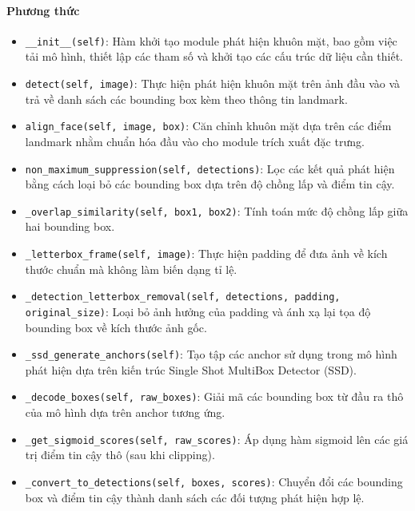 \paragraph{Phương thức}
\begin{itemize}
    \item \texttt{\_\_init\_\_(self)}: Hàm khởi tạo module phát hiện khuôn mặt, bao gồm việc tải mô hình, thiết lập các tham số và khởi tạo các cấu trúc dữ liệu cần thiết.
    
    \item \texttt{detect(self, image)}: Thực hiện phát hiện khuôn mặt trên ảnh đầu vào và trả về danh sách các bounding box kèm theo thông tin landmark.

    \item \texttt{align\_face(self, image, box)}: Căn chỉnh khuôn mặt dựa trên các điểm landmark nhằm chuẩn hóa đầu vào cho module trích xuất đặc trưng.
    
    \item \texttt{non\_maximum\_suppression(self, detections)}: Lọc các kết quả phát hiện bằng cách loại bỏ các bounding box dựa trên độ chồng lấp và điểm tin cậy.
    
    \item \texttt{\_overlap\_similarity(self, box1, box2)}: Tính toán mức độ chồng lấp giữa hai bounding box.
    
    \item \texttt{\_letterbox\_frame(self, image)}: Thực hiện padding để đưa ảnh về kích thước chuẩn mà không làm biến dạng tỉ lệ.
    
    \item \texttt{\_detection\_letterbox\_removal(self, detections, padding, original\_size)}: Loại bỏ ảnh hưởng của padding và ánh xạ lại tọa độ bounding box về kích thước ảnh gốc.
    
    \item \texttt{\_ssd\_generate\_anchors(self)}: Tạo tập các anchor sử dụng trong mô hình phát hiện dựa trên kiến trúc  Single Shot MultiBox Detector (SSD).
    
    \item \texttt{\_decode\_boxes(self, raw\_boxes)}: Giải mã các bounding box từ đầu ra thô của mô hình dựa trên anchor tương ứng.
    
    \item \texttt{\_get\_sigmoid\_scores(self, raw\_scores)}: Áp dụng hàm sigmoid lên các giá trị điểm tin cậy thô (sau khi clipping).
    
    \item \texttt{\_convert\_to\_detections(self, boxes, scores)}: Chuyển đổi các bounding box và điểm tin cậy thành danh sách các đối tượng phát hiện hợp lệ.
\end{itemize}

